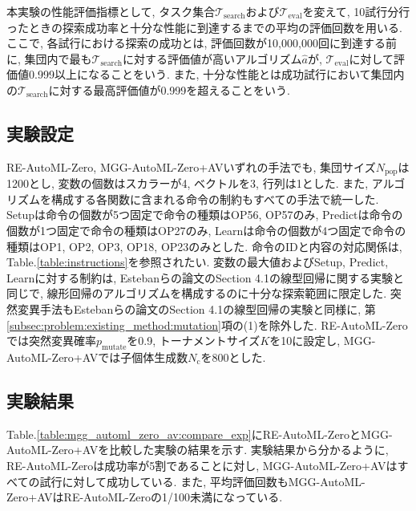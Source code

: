\documentclass[11pt,oneside,openany,report]{jsbook}
\begin{document}
本実験の性能評価指標として, タスク集合$\mathcal{T}_\mathrm{search}$および$\mathcal{T}_\mathrm{eval}$を変えて, 10試行分行ったときの探索成功率と十分な性能に到達するまでの平均の評価回数を用いる. ここで, 各試行における探索の成功とは, 評価回数が10,000,000回に到達する前に, 集団内で最も$\mathcal{T}_\mathrm{search}$に対する評価値が高いアルゴリズム$\hat{a}$が, $\mathcal{T}_\mathrm{eval}$に対して評価値0.999以上になることをいう. また, 十分な性能とは成功試行において集団内の$\mathcal{T}_\mathrm{search}$に対する最高評価値が0.999を超えることをいう.


\subsection{実験設定}\label{mgg_automl_zero_av:exp:setting}

RE-AutoML-Zero, MGG-AutoML-Zero+AVいずれの手法でも, 集団サイズ$N_\mathrm{pop}$は1200とし, 変数の個数はスカラーが4, ベクトルを3, 行列は1とした. また, アルゴリズムを構成する各関数に含まれる命令の制約もすべての手法で統一した. Setupは命令の個数が5つ固定で命令の種類はOP56, OP57のみ, Predictは命令の個数が1つ固定で命令の種類はOP27のみ, Learnは命令の個数が4つ固定で命令の種類はOP1, OP2, OP3, OP18, OP23のみとした. 命令のIDと内容の対応関係は, Table.\ref{table:instructions}を参照されたい. 変数の最大値およびSetup, Predict, Learnに対する制約は, Estebanらの論文\cite{automl_zero}のSection 4.1の線型回帰に関する実験と同じで, 線形回帰のアルゴリズムを構成するのに十分な探索範囲に限定した. 突然変異手法もEstebanらの論文\cite{automl_zero}のSection 4.1の線型回帰の実験と同様に, 第\ref{subsec:problem:existing_method:mutation}項の(1)を除外した. RE-AutoML-Zeroでは突然変異確率$p_\mathrm{mutate}$を0.9, トーナメントサイズ$K$を10に設定し, MGG-AutoML-Zero+AVでは子個体生成数$N_\mathrm{c}$を800とした.

\subsection{実験結果}\label{mgg_automl_zero_av:exp:result}
Table.\ref{table:mgg_automl_zero_av:compare_exp}にRE-AutoML-ZeroとMGG-AutoML-Zero+AVを比較した実験の結果を示す. 実験結果から分かるように, RE-AutoML-Zeroは成功率が5割であることに対し, MGG-AutoML-Zero+AVはすべての試行に対して成功している. また, 平均評価回数もMGG-AutoML-Zero+AVはRE-AutoML-Zeroの1/100未満になっている.
\end{document}
